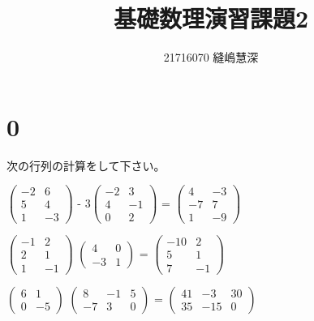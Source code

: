 \documentclass{jsarticle}
\title{基礎数理演習課題2}
\author{21716070 縫嶋慧深}
\begin{document}
	\maketitle

	\section*{0}
	次の行列の計算をして下さい。

	\begin{description}
		\setlength{\itemsep}{0.5cm}

		\item[(1)]
			$ \begin{pmatrix}
				-2 & 6 \\
				5 & 4 \\
				1 & -3
			\end{pmatrix} $
			-
			$ 3 \begin{pmatrix}
				-2 & 3 \\
				4 & -1 \\
				0 & 2
			\end{pmatrix} $
			=
			$ \begin{pmatrix}
				4 & -3 \\
				-7 & 7 \\
				1 & -9
			\end{pmatrix} $

		\item[(2)]
			$ \begin{pmatrix}
				-1 & 2 \\
				2 & 1 \\
				1 & -1
			\end{pmatrix} $
			$ \begin{pmatrix}
				4 & 0 \\
				-3 & 1
			\end{pmatrix} $
			=
			$ \begin{pmatrix}
				-10 & 2 \\
				5 & 1 \\
				7 & -1
			\end{pmatrix} $

		\item[(3)]
			$ \begin{pmatrix}
				6 & 1 \\
				0 & -5
			\end{pmatrix} $
			$ \begin{pmatrix}
				8 & -1 & 5 \\
				-7 & 3 & 0
			\end{pmatrix} $
			=
			$ \begin{pmatrix}
				41 & -3 & 30 \\
				35 & -15 & 0
			\end{pmatrix} $


\end{description}
\end{document}
